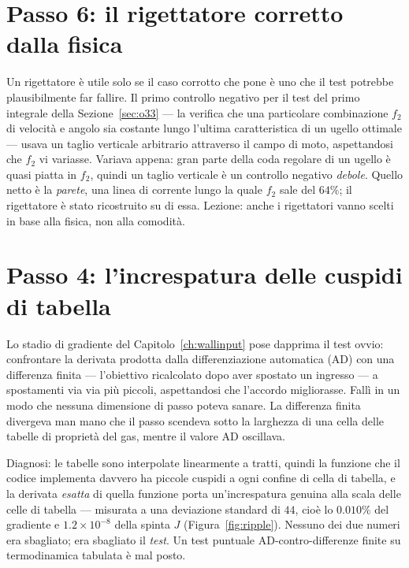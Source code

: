 \section{Passo 6: il rigettatore corretto dalla fisica}
\label{app:f2rejector}

Un rigettatore è utile solo se il caso corrotto che pone è uno che il
test potrebbe plausibilmente far fallire. Il primo controllo negativo
per il test del primo integrale della Sezione~\ref{sec:o33} --- la
verifica che una particolare combinazione $f_2$ di velocità e angolo
sia costante lungo l'ultima caratteristica di un ugello ottimale ---
usava un taglio verticale arbitrario attraverso il campo di moto,
aspettandosi che $f_2$ vi variasse. Variava appena: gran parte della
coda regolare di un ugello è quasi piatta in $f_2$, quindi un taglio
verticale è un controllo negativo \emph{debole}. Quello netto è la
\emph{parete}, una linea di corrente lungo la quale $f_2$ sale del
$64\%$; il rigettatore è stato ricostruito su di essa. Lezione: anche
i rigettatori vanno scelti in base alla fisica, non alla comodità.

\section{Passo 4: l'increspatura delle cuspidi di tabella}
\label{app:ripple}

Lo stadio di gradiente del Capitolo~\ref{ch:wallinput} pose dapprima
il test ovvio: confrontare la derivata prodotta dalla
differenziazione automatica (AD) con una differenza finita ---
l'obiettivo ricalcolato dopo aver spostato un ingresso --- a
spostamenti via via più piccoli, aspettandosi che l'accordo
migliorasse. Fallì in un modo che nessuna dimensione di passo poteva
sanare. La differenza finita divergeva man mano che il passo scendeva
sotto la larghezza di una cella delle tabelle di proprietà del gas,
mentre il valore AD oscillava.

Diagnosi: le tabelle sono interpolate linearmente a tratti, quindi la
funzione che il codice implementa davvero ha piccole cuspidi a ogni
confine di cella di tabella, e la derivata \emph{esatta} di quella
funzione porta un'increspatura genuina alla scala delle celle di
tabella --- misurata a una deviazione standard di $44$, cioè lo
$0.010\%$ del gradiente e $1.2\times10^{-8}$ della spinta $J$
(Figura~\ref{fig:ripple}). Nessuno dei due numeri era sbagliato; era
sbagliato il \emph{test}. Un test puntuale AD-contro-differenze
finite su termodinamica tabulata è mal posto.

